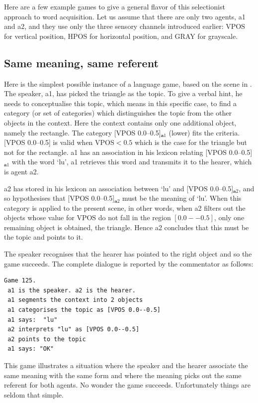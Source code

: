 Here are a few example games to give a general 
flavor of this selectionist approach to word acquisition. 
Let us assume that there are only two 
agents, {\bfshape a1} and {\bfshape a2}, and they use only the 
three sensory channels introduced earlier: VPOS for 
vertical position, HPOS for horizontal position, and GRAY
for grayscale. 

\subsection{Same meaning, same referent}

Here is the simplest possible instance of a
language game, based on the scene in . 
The speaker, {\bfshape a1}, has picked the triangle as the topic.
To give a verbal hint, he needs 
to conceptualise this topic, which means in this 
specific case, to find a 
category (or set of categories) which distinguishes the 
topic from the other objects in the context. Here 
the context contains only one additional 
object, namely the rectangle. The category
[VPOS 0.0--0.5]$_{\mathbf a1}$ (lower) fits the criteria. 
[VPOS 0.0--0.5] is valid when VPOS$ < 0.5$
which is the case for the triangle but not for the rectangle. 
{\bfshape a1} has an association in his lexicon 
relating [VPOS 0.0--0.5]$_{\mathbf  a1}$ with the word `lu', 
{\bfshape a1} retrieves this word and transmits it to 
the hearer, which is agent {\bfshape a2}. 

{\bfshape a2} has stored in his lexicon an
association between `lu' and [VPOS 0.0--0.5]$_{\mathbf  a2}$, and so
hypothesises that [VPOS 0.0--0.5]$_{\mathbf  a2}$ must be the meaning of `lu'. 
When this category is applied to the present scene, in other words,
when {\bfshape a2} filters out the objects whose value for VPOS do not 
fall in the region $[0.0--0.5]$, only one 
remaining object is obtained, the triangle. Hence {\bfshape a2} concludes that 
this must be the topic and points to it. 

The speaker recognises that the hearer has pointed
to the right object and so the game succeeds. The complete
dialogue is reported by the commentator as follows: 
\begin{verbatim}
Game 125.
 a1 is the speaker. a2 is the hearer. 
 a1 segments the context into 2 objects
 a1 categorises the topic as [VPOS 0.0--0.5]
 a1 says:  "lu"
 a2 interprets "lu" as [VPOS 0.0--0.5]
 a2 points to the topic 
 a1 says: "OK" 
\end{verbatim}
This game illustrates a situation 
where the speaker and the hearer associate the same meaning
with the same form and where the meaning 
picks out the same referent for both agents. No wonder
the game succeeds. Unfortunately things are seldom that simple. 

